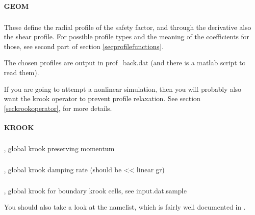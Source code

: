 \paragraph{GEOM}
\subparagraph{}
\subparagraph{}
These define the radial profile of the safety factor, and through the
derivative also the shear profile. For possible profile types and the meaning
of the coefficients for those, see second part of section \ref{secprofilefunctions}.

The chosen profiles are output in prof_back.dat 
(and there is a matlab script to read them). 

If you are going to attempt a nonlinear simulation, then you will
probably also want the krook operator to prevent profile relaxation.
See section \ref{seckrookoperator}, for more details.

\paragraph{KROOK}
\subparagraph{}, global krook preserving momentum
\subparagraph{}, global krook damping rate (should be << linear gr)
\subparagraph{}, global krook
for boundary krook cells, see input.dat.sample

You should also take a look at the  namelist, which
is fairly well documented in .

\pagebreak

